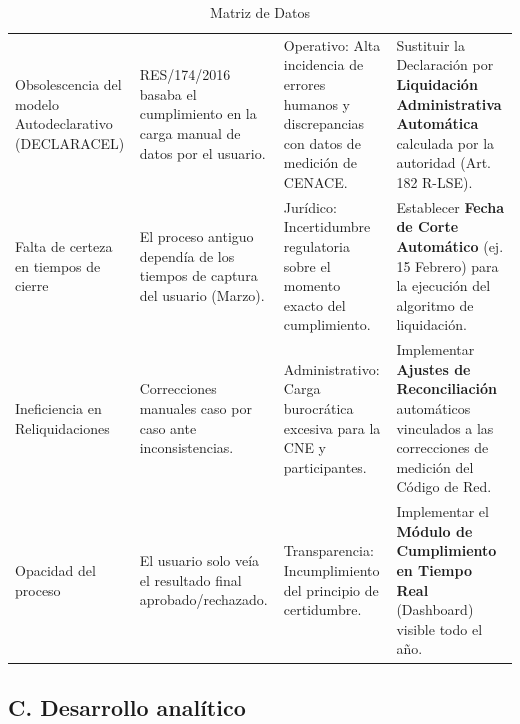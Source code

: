 \documentclass{cel}
\begin{document}
\vspace{0.3cm}
\begin{tabladoradoLargo}
\renewcommand{\tabularxcolumn}[1]{p{#1}}
\begin{xltabular}{\textwidth}{|X|X|X|X|}
\caption{Matriz de Datos} \\
\toprule
{}  &  &  &  \\
\midrule
\endhead
Obsolescencia del modelo \textquotedbl{}Autodeclarativo\textquotedbl{} (DECLARACEL) & RES/174/2016 basaba el cumplimiento en la carga manual de datos por el usuario. & Operativo: Alta incidencia de errores humanos y discrepancias con datos de medición de CENACE. & Sustituir la \textquotedbl{}Declaración\textquotedbl{} por \textbf{\textquotedbl{}Liquidación Administrativa Automática\textquotedbl{}} calculada por la autoridad (Art. 182 R-LSE). \\ \hline
Falta de certeza en tiempos de cierre & El proceso antiguo dependía de los tiempos de captura del usuario (Marzo). & Jurídico: Incertidumbre regulatoria sobre el momento exacto del  cumplimiento. & Establecer \textbf{Fecha de Corte Automático} (ej. 15 Febrero) para la ejecución del algoritmo de liquidación. \\ \hline
Ineficiencia en Reliquidaciones & Correcciones manuales \textquotedbl{}caso por caso\textquotedbl{} ante inconsistencias. & Administrativo: Carga burocrática excesiva para la CNE y participantes. & Implementar \textbf{\textquotedbl{}Ajustes de Reconciliación\textquotedbl{}} automáticos vinculados a las correcciones de medición del Código de Red. \\ \hline
Opacidad del proceso & El usuario solo veía el resultado final \textquotedbl{}aprobado/rechazado\textquotedbl{}. & Transparencia: Incumplimiento del principio de certidumbre. & Implementar el \textbf{\textquotedbl{}Módulo de Cumplimiento en Tiempo Real\textquotedbl{}} (Dashboard) visible todo el año. \\ \hline
\bottomrule
\end{xltabular}
\end{tabladoradoLargo}

\subsection{C. Desarrollo analítico}
\nopagebreak
\end{document}
